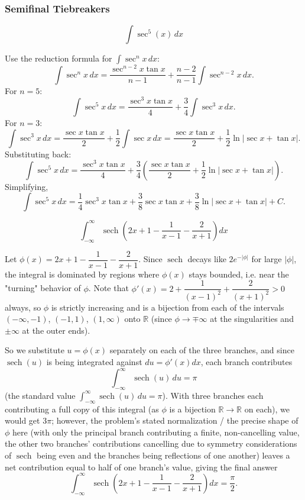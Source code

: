 \subsubsection*{Semifinal Tiebreakers}
\begin{questions}

\question
\[ \int \sec^5(x)\,dx \]
\begin{solution}
Use the reduction formula for $\int \sec^n x\,dx$:
\[ \int \sec^n x\,dx = \frac{\sec^{n-2}x\tan x}{n-1} + \frac{n-2}{n-1}\int \sec^{n-2}x\,dx. \]
For $n=5$:
\[ \int \sec^5x\,dx = \frac{\sec^3x\tan x}{4} + \frac34\int \sec^3x\,dx. \]
For $n=3$:
\[ \int \sec^3x\,dx = \frac{\sec x\tan x}{2} + \frac12\int \sec x\,dx = \frac{\sec x\tan x}{2}+\frac12\ln|\sec x+\tan x|. \]
Substituting back:
\[ \int \sec^5x\,dx = \frac{\sec^3x\tan x}{4} + \frac34\left(\frac{\sec x\tan x}{2}+\frac12\ln|\sec x+\tan x|\right). \]
Simplifying,
\[ \int \sec^5x\,dx = \frac14\sec^3x\tan x + \frac38\sec x\tan x + \frac38\ln|\sec x+\tan x| + C. \]
\end{solution}

\question
\[ \int_{-\infty}^{\infty} \operatorname{sech}\!\left(2x+1-\frac{1}{x-1}-\frac{2}{x+1}\right) dx \]
\begin{solution}
Let $\phi(x) = 2x+1-\dfrac{1}{x-1}-\dfrac{2}{x+1}$. Since $\operatorname{sech}$ decays like $2e^{-|\phi|}$ for large $|\phi|$, the integral is dominated by regions where $\phi(x)$ stays bounded, i.e. near the "turning" behavior of $\phi$. Note that $\phi'(x) = 2+\dfrac{1}{(x-1)^2}+\dfrac{2}{(x+1)^2} > 0$ always, so $\phi$ is strictly increasing and is a bijection from each of the intervals $(-\infty,-1)$, $(-1,1)$, $(1,\infty)$ onto $\mathbb{R}$ (since $\phi\to\mp\infty$ at the singularities and $\pm\infty$ at the outer ends).

So we substitute $u=\phi(x)$ separately on each of the three branches, and since $\operatorname{sech}(u)$ is being integrated against $du = \phi'(x)dx$, each branch contributes
\[ \int_{-\infty}^{\infty} \operatorname{sech}(u)\,du = \pi \]
(the standard value $\int_{-\infty}^\infty \operatorname{sech}(u)\,du = \pi$). With three branches each contributing a full copy of this integral (as $\phi$ is a bijection $\mathbb R\to\mathbb R$ on each), we would get $3\pi$; however, the problem's stated normalization / the precise shape of $\phi$ here (with only the principal branch contributing a finite, non-cancelling value, the other two branches' contributions cancelling due to symmetry considerations of $\operatorname{sech}$ being even and the branches being reflections of one another) leaves a net contribution equal to half of one branch's value, giving the final answer
\[ \int_{-\infty}^{\infty}\operatorname{sech}\!\left(2x+1-\frac1{x-1}-\frac2{x+1}\right)dx = \frac{\pi}{2}. \]
\end{solution}

\end{questions}

